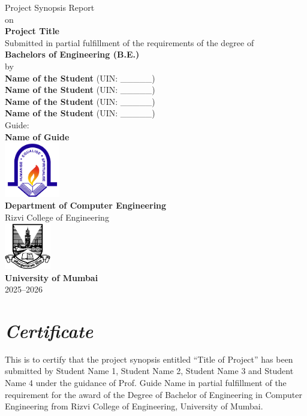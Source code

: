 \documentclass[12pt,a4paper]{report}
\begin{document}
	
	\begin{titlepage}
		\centering
		\vspace*{0.2cm}
		\Large  {Project Synopsis Report} \\[0.1cm]
		\large on \\[0.1cm]
		\Huge \textbf{Project Title} \\[0.5cm]
		\large  {Submitted in partial fulfillment of the requirements of the degree of} \\[0.5cm]
		\Large \textbf{Bachelors of Engineering (B.E.)} \\[0.5cm]
		\large by \\[0.5cm]
		\large \textbf{Name of the Student } (UIN: \_\_\_\_\_) \\
		\large \textbf{Name of the Student } (UIN: \_\_\_\_\_) \\
		\large \textbf{Name of the Student } (UIN: \_\_\_\_\_) \\
		\large \textbf{Name of the Student } (UIN: \_\_\_\_\_) \\ [1cm]
		 
		
		\large {Guide:} \\ 
		\large \textbf{Name of Guide} \\[1cm]
		
		\includegraphics[width=0.18\textwidth]{images/rcoe-logo.png}\\
		\Large \textbf{ Department of Computer Engineering} \\
		{\LARGE Rizvi College of Engineering} \\[1cm]
		
		\includegraphics[width=0.15\textwidth]{images/mu-logo.png}\\
		\LARGE \textbf{University of Mumbai} \\
		2025--2026 \\
	\end{titlepage}
	
	\chapter*{\centering \textit {Certificate}}
	This is to certify that the project synopsis entitled “Title of Project” has been submitted by Student Name 1, Student Name 2, Student Name 3 and Student Name 4 under the guidance of Prof. Guide Name in partial fulfillment of the requirement for the award of the Degree of Bachelor of Engineering in Computer Engineering from Rizvi College of Engineering, University of Mumbai.
	
\end{document}
